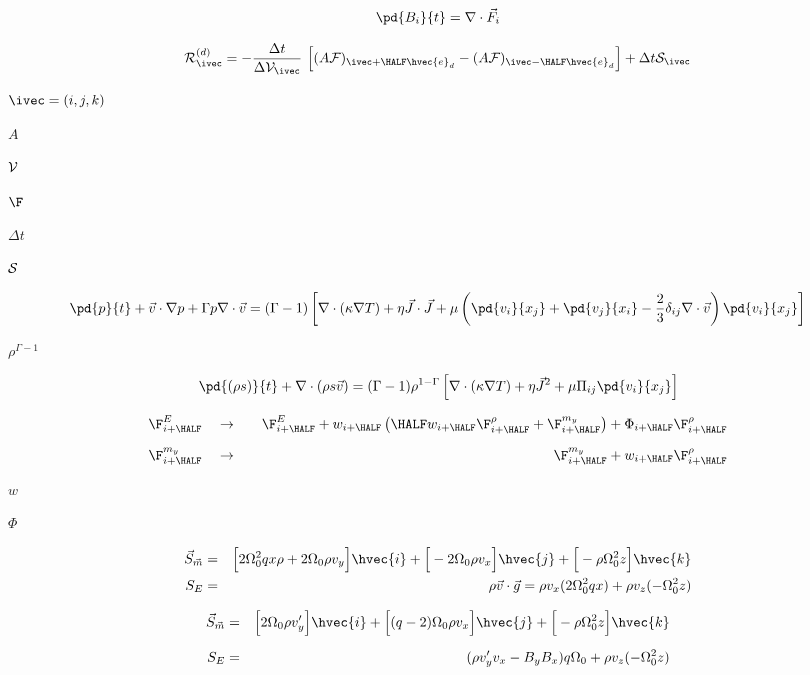 \documentclass{article}
\begin{document}
\[
   \pd{B_i}{t} = \nabla\cdot\vec{F}_i
\]
\pagebreak

\[
    {\cal R}_{\ivec}^{(d)} = 
    -\frac{\Delta t}{\Delta{\cal V}_{\ivec}}\
    \Big[  (A{\cal F})_{\ivec+\HALF\hvec{e}_d} 
          -(A{\cal F})_{\ivec-\HALF\hvec{e}_d} \Big]
       + \Delta t{\cal S}_{\ivec}
\]
\pagebreak

$\ivec = (i,j,k)$
\pagebreak

$ A        $
\pagebreak

$ {\cal V} $
\pagebreak

$ \F   $
\pagebreak

$ \Delta t $
\pagebreak

$ {\cal S} $
\pagebreak

\[
    \pd{p}{t} + \vec{v}\cdot\nabla p + \Gamma p \nabla\cdot\vec{v}
  = (\Gamma-1)\left[\nabla\cdot\left(\kappa\nabla T\right)
    + \eta\vec{J}\cdot\vec{J} + \mu\left(\pd{v_i}{x_j}+\pd{v_j}{x_i}
      - \frac{2}{3}\delta_{ij}\nabla\cdot\vec{v}\right)\pd{v_i}{x_j}\right]
\]
\pagebreak

$\rho^{\Gamma-1}$
\pagebreak

\[
   \pd{(\rho s)}{t} + \nabla\cdot(\rho s\vec{v}) = 
   (\Gamma-1)\rho^{1-\Gamma}\left[\nabla\cdot\left(\kappa\nabla T\right)
     + \eta\vec{J}^2 + \mu \Pi_{ij}\pd{v_i}{x_j}\right]
\]
\pagebreak

\begin{eqnarray*}
   \F^{E}_{i+\HALF} &\quad \to\quad&
   \F^{E}_{i+\HALF} + w_{i+\HALF}\left(\HALF w_{i+\HALF}\F^{\rho}_{i+\HALF}
    + \F^{m_y}_{i+\HALF}\right) +  \Phi_{i+\HALF}\F^{\rho}_{i+\HALF}                           
   \\ \noalign{\medskip}
   \F^{m_y}_{i+\HALF} &\quad \to\quad&
   \F^{m_y}_{i+\HALF} + w_{i+\HALF}\F^{\rho}_{i+\HALF}
\end{eqnarray*}
\pagebreak

$w$
\pagebreak

$\Phi$
\pagebreak

\begin{eqnarray*} 
      \vec{S}_{\vec{m}} &=&
         \Big[ 2\Omega_0^2 q x \rho + 2\Omega_0\rho v_y\Big]\hvec{i}
       + \Big[-2\Omega_0\rho v_x\Big]\hvec{j}
       + \Big[-\rho\Omega_0^2z\Big]\hvec{k} \\ 
       S_E &=& \rho \vec{v} \cdot\vec{g}
       = \rho v_x (2\Omega_0^2 qx) + \rho v_z (-\Omega_0^2 z)
    \end{eqnarray*}
\pagebreak

\begin{eqnarray*} 
     \vec{S}_{\vec{m}} &=&
           \Big[ 2\Omega_0\rho v'_y\Big]\hvec{i}
         + \Big[(q-2)\Omega_0\rho v_x\Big]\hvec{j}
         + \Big[-\rho\Omega_0^2z\Big]\hvec{k} \\ \noalign{\medskip}
       S_E &=& (\rho v'_yv_x - B_yB_x)q\Omega_0 + \rho v_z(-\Omega_0^2 z)
    \end{eqnarray*}
\pagebreak
\end{document}
